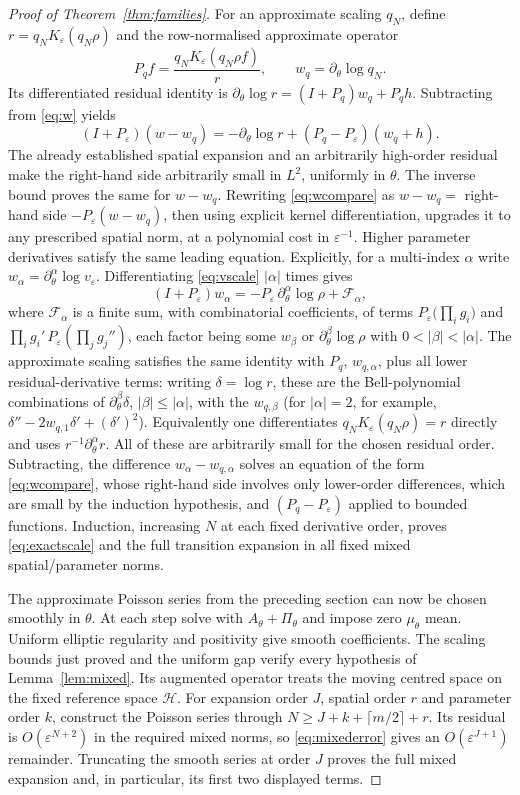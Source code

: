 \documentclass[11pt,a4paper]{article}
\theoremstyle{definition}\newtheorem{definition}[theorem]{Definition}
\theoremstyle{remark}\newtheorem{remark}[theorem]{Remark}
\newcommand{\eps}{\varepsilon}
\begin{document}
\begin{proof}[Proof of Theorem~\ref{thm:families}]
For an approximate scaling $q_N$, define $r=q_NK_\eps(q_N\rho)$ and the row-normalised approximate operator
\[
P_qf=\frac{q_NK_\eps(q_N\rho f)}{r},\qquad w_q=\partial_\theta\log q_N.
\]
Its differentiated residual identity is
$\partial_\theta\log r=(I+P_q)w_q+P_qh$.
Subtracting from \eqref{eq:w} yields
\begin{equation}\label{eq:wcompare}
(I+P_\eps)(w-w_q)
=-\partial_\theta\log r+(P_q-P_\eps)(w_q+h).
\end{equation}
The already established spatial expansion and an arbitrarily high-order residual make the right-hand side arbitrarily small in $L^2$, uniformly in $\theta$. The inverse bound proves the same for $w-w_q$. Rewriting \eqref{eq:wcompare} as $w-w_q=$ right-hand side $-P_\eps(w-w_q)$, then using explicit kernel differentiation, upgrades it to any prescribed spatial norm, at a polynomial cost in $\eps^{-1}$. Higher parameter derivatives satisfy the same leading equation. Explicitly, for a multi-index $\alpha$ write $w_\alpha=\partial_\theta^\alpha\log v_\eps$. Differentiating \eqref{eq:vscale} $|\alpha|$ times gives
\[
(I+P_\eps)w_\alpha=-P_\eps\,\partial_\theta^\alpha\log\rho+\mathcal F_\alpha,
\]
where $\mathcal F_\alpha$ is a finite sum, with combinatorial coefficients, of terms $P_\eps\bigl(\prod_i g_i\bigr)$ and $\prod_i g_i'\,P_\eps(\prod_j g_j'')$, each factor being some $w_\beta$ or $\partial_\theta^\beta\log\rho$ with $0<|\beta|<|\alpha|$. The approximate scaling satisfies the same identity with $P_q$, $w_{q,\alpha}$, plus all lower residual-derivative terms: writing $\delta=\log r$, these are the Bell-polynomial combinations of $\partial_\theta^\beta\delta$, $|\beta|\le|\alpha|$, with the $w_{q,\beta}$ (for $|\alpha|=2$, for example, $\delta''-2w_{q,1}\delta'+(\delta')^2$). Equivalently one differentiates $q_NK_\eps(q_N\rho)=r$ directly and uses $r^{-1}\partial_\theta^\alpha r$. All of these are arbitrarily small for the chosen residual order. Subtracting, the difference $w_\alpha-w_{q,\alpha}$ solves an equation of the form \eqref{eq:wcompare}, whose right-hand side involves only lower-order differences, which are small by the induction hypothesis, and $(P_q-P_\eps)$ applied to bounded functions. Induction, increasing $N$ at each fixed derivative order, proves \eqref{eq:exactscale} and the full transition expansion in all fixed mixed spatial/parameter norms.

The approximate Poisson series from the preceding section can now be chosen smoothly in $\theta$. At each step solve with $A_\theta+\Pi_\theta$ and impose zero $\mu_\theta$ mean. Uniform elliptic regularity and positivity give smooth coefficients. The scaling bounds just proved and the uniform gap verify every hypothesis of Lemma~\ref{lem:mixed}. Its augmented operator treats the moving centred space on the fixed reference space $\mathcal H$. For expansion order $J$, spatial order $r$ and parameter order $k$, construct the Poisson series through $N\geq J+k+\lceil m/2\rceil+r$. Its residual is $O(\eps^{N+2})$ in the required mixed norms, so \eqref{eq:mixederror} gives an $O(\eps^{J+1})$ remainder. Truncating the smooth series at order $J$ proves the full mixed expansion and, in particular, its first two displayed terms.


\end{proof}
\end{document}
